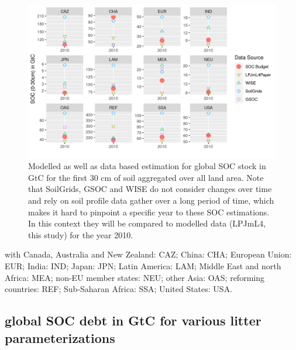 \documentclass[gc, manuscript]{copernicus}
\begin{document}
\begin{figure}[H]
\includegraphics[width=1\linewidth]{../ResultNotebooks/Output/Images/reg_comparisonfigure} \caption{Modelled as well as data based estimation for global SOC stock in GtC for the first 30 cm of soil aggregated over all land area. Note that SoilGrids, GSOC and WISE do not consider changes over time and rely on soil profile data gather over a long period of time, which makes it hard to pinpoint a specific year to these SOC estimations. In this context they will be compared to modelled data (LPJmL4, this study) for the year 2010.}\label{fig:regSOCtable}
\end{figure}

with
Canada, Australia and New Zealand: CAZ;
China: CHA;
European Union: EUR;
India: IND;
Japan: JPN;
Latin America: LAM;
Middle East and north Africa: MEA;
non-EU member states: NEU;
other Asia: OAS; reforming countries: REF; Sub-Saharan Africa:
SSA; United States: USA.

\hypertarget{append:senslitterpnv}{%
\subsection{global SOC debt in GtC for various litter parameterizations}\label{append:senslitterpnv}}

\newpage




\end{document}
